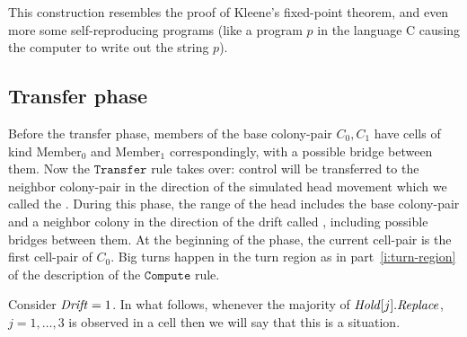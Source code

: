 \documentclass[11pt]{memoir}
\theoremstyle{definition} %
\newcommand{\fld}[1]{\ensuremath{\textit{#1\/}}}
\newcommand{\rul}[1]{\ensuremath{\texttt{#1}}}
\newcommand{\Drift}{\fld{Drift}}
\newcommand{\Hold}{\fld{Hold}}
\newcommand{\Replace}{\fld{Replace}}
\newcommand{\Member}{\mathrm{Member}}
\newcommand{\Compute}{\rul{Compute}}
\newcommand{\Transfer}{\rul{Transfer}}
\begin{document}
\begin{remark}
  This construction resembles the proof of Kleene's fixed-point theorem, and even more
  some self-reproducing programs (like a program \( p \) in the language C causing the computer
  to write out the string \( p \)).
\end{remark}

\subsection{Transfer phase}\label{sec:transfer}

Before the transfer phase, members of the base colony-pair \( C_{0},C_{1} \) have
cells of kind \( \Member_{0} \) and \( \Member_{1} \) correspondingly,
with a possible bridge between them.
Now the \( \Transfer \) rule takes over: control will be transferred to the
neighbor colony-pair in the direction of the simulated head movement which we called 
the .
During this phase, the range of the head includes the base colony-pair and a neighbor colony
in the direction of the drift called , including possible bridges between them.
At the beginning of the phase, the current cell-pair is the first cell-pair of \( C_{0} \).
Big turns happen in the turn region as in part~\ref{i:turn-region} of the
description of the \( \Compute \) rule.

Consider \( \Drift=1 \).
In what follows, whenever the majority of \( \Hold[j].\Replace \), \( j=1,\dots,3 \) is observed
in a cell then we will say that this is a  situation.
\end{document}

